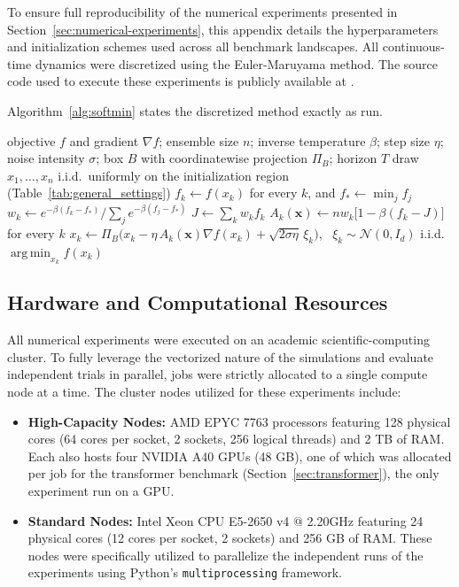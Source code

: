 \documentclass{article} %
\theoremstyle{plain}
\theoremstyle{definition}
\theoremstyle{remark}
\newcommand{\prefactor}[2]{A_{#1}(#2)}
\DeclareMathOperator*{\argmin}{arg\,min}
\newcommand{\xx}{\mathbf{x}}
\begin{document}
To ensure full reproducibility of the numerical experiments presented in Section~\ref{sec:numerical-experiments}, this appendix details the hyperparameters and initialization schemes used across all benchmark landscapes. All continuous-time dynamics were discretized using the Euler-Maruyama method. The source code used to execute these experiments is publicly available at \citep{softmin_energy_2026}.

Algorithm~\ref{alg:softmin} states the discretized method exactly as run.

\begin{algorithm}[!htbp]
\caption{Softmin energy dynamics: Euler--Maruyama discretization of \eqref{e:sde}.}
\label{alg:softmin}
\begin{algorithmic}[1]
\Require objective $f$ and gradient $\nabla f$; ensemble size $n$; inverse temperature $\beta$; step size $\eta$; noise intensity $\sigma$; box $B$ with coordinatewise projection $\Pi_B$; horizon $T$
\State draw $x_1,\dots,x_n$ i.i.d.\ uniformly on the initialization region (Table~\ref{tab:general_settings})
    \State $f_k\gets f(x_k)$ for every $k$, and $f_\ast\gets\min_j f_j$
    \State $w_k\gets e^{-\beta(f_k-f_\ast)}\bigl/\sum_{j}e^{-\beta(f_j-f_\ast)}$ 
    \State $J\gets\sum_k w_kf_k$ 
    \State $\prefactor{k}{\xx}\gets nw_k\bigl[1-\beta(f_k-J)\bigr]$ for every $k$ 
    \State $x_k\gets\Pi_B\bigl(x_k-\eta\,\prefactor{k}{\xx}\nabla f(x_k)+\sqrt{2\sigma\eta}\,\xi_k\bigr)$, \ $\xi_k\sim\mathcal{N}(0,I_d)$ i.i.d.
\EndFor
\State \Return $\argmin_{x_k}f(x_k)$
\end{algorithmic}
\end{algorithm}

\subsection{Hardware and Computational Resources}
All numerical experiments were executed on an academic scientific-computing cluster. To fully leverage the vectorized nature of the simulations and evaluate independent trials in parallel, jobs were strictly allocated to a single compute node at a time. The cluster nodes utilized for these experiments include:
\begin{itemize}
    \item \textbf{High-Capacity Nodes:} AMD EPYC 7763 processors featuring 128 physical cores (64 cores per socket, 2 sockets, 256 logical threads) and 2 TB of RAM. Each also hosts four NVIDIA A40 GPUs (48 GB), one of which was allocated per job for the transformer benchmark (Section~\ref{sec:transformer}), the only experiment run on a GPU.
    \item \textbf{Standard Nodes:} Intel Xeon CPU E5-2650 v4 @ 2.20GHz featuring 24 physical cores (12 cores per socket, 2 sockets) and 256 GB of RAM. These nodes were specifically utilized to parallelize the independent runs of the experiments using Python's \texttt{multiprocessing} framework.
\end{itemize}
\end{document}
